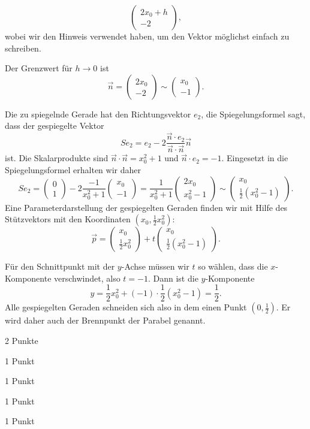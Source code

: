 \begin{loesung}
\begin{teilaufgaben}
\[\begin{pmatrix}
2x_0+h\\-2
\end{pmatrix},
\]
wobei wir den Hinweis verwendet haben, um den Vektor möglichst einfach zu
schreiben.
\item
Der Grenzwert für $h\to 0$ ist 
\[
\vec{n} = \begin{pmatrix}2x_0\\-2\end{pmatrix}
\sim
\begin{pmatrix}x_0\\-1\end{pmatrix}.
\]
\item
Die zu spiegelnde Gerade hat den Richtungsvektor $e_2$, die Spiegelungsformel
sagt, dass der gespiegelte Vektor
\[
Se_2
=
e_2 - 2\frac{\vec{n}\cdot e_2}{\vec{n}\cdot\vec{n}}\vec{n}
\]
ist.
Die Skalarprodukte sind $\vec{n}\cdot\vec{n}=x_0^2+1$ und $\vec{n}\cdot e_2=-1$.
Eingesetzt in die Spiegelungsformel erhalten wir daher
\[
Se_2
=
\begin{pmatrix}0\\1\end{pmatrix} -2\frac{-1}{x_0^2+1}\begin{pmatrix} x_0\\-1\end{pmatrix}
=
\frac{1}{x_0^2 + 1}\begin{pmatrix}2x_0\\ x_0^2-1 \end{pmatrix}
\sim
\begin{pmatrix}x_0\\\frac12(x_0^2-1)\end{pmatrix}.
\]
Eine Parameterdarstellung der gespiegelten Geraden finden wir mit
Hilfe des Stützvektors mit den Koordinaten $(x_0,\frac12x_0^2)$:
\[
\vec{p}
=
\begin{pmatrix}x_0\\\frac12x_0^2\end{pmatrix}
+
t\begin{pmatrix}x_0\\\frac12(x_0^2-1)\end{pmatrix}.
\]
\item
Für den Schnittpunkt mit der $y$-Achse müssen wir $t$ so wählen, dass
die $x$-Komponente verschwindet, also $t=-1$.
Dann ist die $y$-Komponente
\[
y = \frac12x_0^2 + (-1)\cdot\frac12(x_0^2-1) = \frac12.
\]
Alle gespiegelten Geraden schneiden sich also in dem einen Punkt
$(0,\frac12)$.
Er wird daher auch der Brennpunkt der Parabel genannt.
\qedhere
\end{teilaufgaben}
\end{loesung}


\begin{bewertung}
\begin{teilaufgaben}
\item 2 Punkte
\item 1 Punkt
\item 1 Punkt
\item 1 Punkt
\item 1 Punkt
\end{teilaufgaben}
\end{bewertung}
